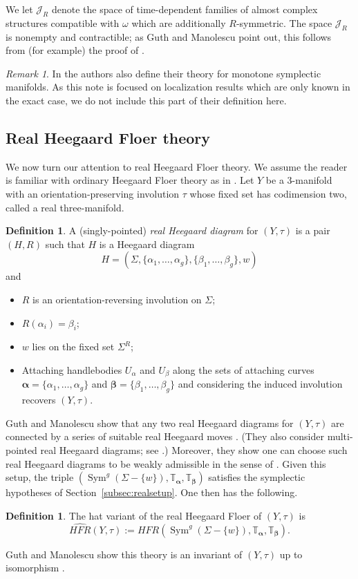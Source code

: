 \documentclass[11pt,reqno]{amsart}
\theoremstyle{definition}
\newtheorem{define}[thm]{Definition}
\theoremstyle{remark}
\newtheorem{rem}[thm]{Remark}
\newcommand{\T}{\mathbb{T}}
\DeclareMathOperator{\Sym}{{Sym}}
\newcommand{\alphas}{\boldsymbol \alpha}
\newcommand{\betas}{\boldsymbol \beta}
\newcommand{\HFR}{\mathit{HFR}}
\newcommand{\HFRhat}{\widehat{\HFR}}
\numberwithin{equation}{section}
\begin{document}
We let $\mathcal J_R$ denote the space of time-dependent families of almost complex structures compatible with $\omega$ which are additionally $R$-symmetric. The space $\mathcal J_R$ is nonempty and contractible; as Guth and Manolescu point out, this follows from (for example) the proof of \cite[Proposition 1.1]{Welschinger:rational}.

\begin{rem} In \cite{GM:real} the authors also define their theory for monotone symplectic manifolds. As this note is focused on localization results which are only known in the exact case, we do not include this part of their definition here.\end{rem}


\subsection{Real Heegaard Floer theory}

We now turn our attention to real Heegaard Floer theory. We assume the reader is familiar with ordinary Heegaard Floer theory as in \cite{OSDisks, OSProperties}. Let $Y$ be a $3$-manifold with an orientation-preserving involution $\tau$ whose fixed set has codimension two, called a real three-manifold.

\begin{define} \cite[Definition 3.1]{GM:real} A (singly-pointed) \emph{real Heegaard diagram} for $(Y, \tau)$ is a pair $(H, R)$ such that $H$ is a Heegaard diagram \[H = (\Sigma, \{\alpha_1, \dots, \alpha_g\}, \{\beta_1, \dots, \beta_g\}, w)\] and
%
\begin{itemize}
\item $R$ is an orientation-reversing involution on $\Sigma$;
\item $R(\alpha_i) =\beta_i$;
\item $w$ lies on the fixed set $\Sigma^R$;
\item Attaching handlebodies $U_{\alpha}$ and $U_{\beta}$ along the sets of attaching curves $\alphas = \{\alpha_1, \dots, \alpha_g\}$ and $\betas = \{\beta_1, \dots, \beta_g\}$ and considering the induced involution recovers $(Y, \tau)$.
\end{itemize}
%
\end{define}
%
Guth and Manolescu show that any two real Heegaard diagrams for $(Y, \tau)$ are connected by a series of suitable real Heegaard moves \cite[Proposition 3.14]{GM:real}. (They also consider multi-pointed real Heegaard diagrams; see \cite[Section 3.3]{GM:real}.) Moreover, they show \cite[Section 3.8]{GM:real} one can choose such real Heegaard diagrams to be weakly admissible in the sense of \cite[Definition 4.10]{OSDisks}. Given this setup, the triple $(\Sym^g(\Sigma -\{w\}), \T_{\alphas}, \T_{\betas})$ satisfies the symplectic hypotheses of Section~\ref{subsec:realsetup}. One then has the following.
\begin{define} \cite[Section 3]{GM:real} The hat variant of the real Heegaard Floer of $(Y, \tau)$ is
%
\[\HFRhat(Y, \tau) := \HFR(\Sym^g(\Sigma - \{w\}), \T_{\alphas}, \T_{\betas}). \]
%
\end{define}
%
Guth and Manolescu show this theory is an invariant of $(Y, \tau)$ up to isomorphism \cite[Section 5]{GM:real}.
\end{document}
